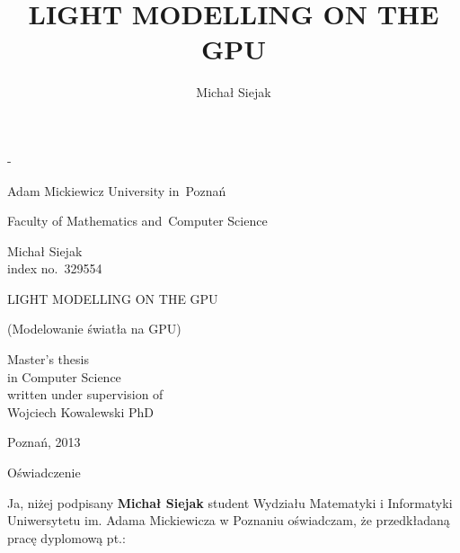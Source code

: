 \documentclass[twoside,openright,a4paper,12pt]{memoir}
\theoremstyle{definition}
\begin{document}
\title{LIGHT MODELLING ON THE GPU}
\author{Michał Siejak}

\frontmatter
{}

\begin{titlingpage}
\calccentering{\unitlength}
\begin{adjustwidth*}{\unitlength}{-\unitlength}
\begin{center}
  
 \begin{LARGE}
   Adam Mickiewicz University in~Poznań\\
   \begin{Large}
     Faculty of Mathematics and~Computer Science\\
   \end{Large}
   \vspace{1.5cm}
   \begin{huge}
     Michał Siejak\\
     \small{index no.~329554}\\
   \end{huge}
   \vspace{1.5cm}
   \begin{Huge}
     LIGHT MODELLING ON THE GPU
   \end{Huge}
   \vspace{0.3cm}
   \begin{footnotesize}
     (Modelowanie światła na GPU)
   \end{footnotesize}
   \vspace{2.0cm}
    \begin{flushleft}
      \hsize
      \large
      Master's thesis\\
      in Computer Science\\
      written under supervision of\\
      Wojciech Kowalewski PhD\\
    \end{flushleft}
    \vfill
    Poznań, 2013
 \end{LARGE}
\end{center}
\end{adjustwidth*}
\end{titlingpage}

\setcounter{page}{2}

\begin{center}
  \LARGE{Oświadczenie}
\end{center}

Ja, niżej podpisany \textbf{Michał Siejak} student Wydziału
Matematyki i Informatyki Uniwersytetu im. Adama Mickiewicza w Poznaniu
oświadczam, że przedkładaną pracę dyplomową pt.:
\end{document}
